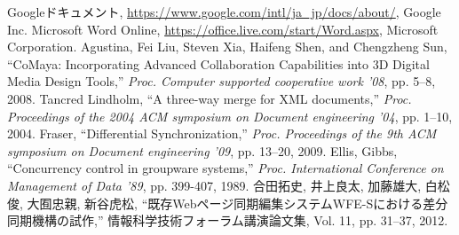 \renewcommand{\bibname}{参考文献}
\begin{thebibliography}{Longest9}

Googleドキュメント, \url{https://www.google.com/intl/ja_jp/docs/about/}, Google Inc.
Microsoft Word Online, \url{https://office.live.com/start/Word.aspx}, Microsoft Corporation.
Agustina, Fei Liu, Steven Xia, Haifeng Shen, and Chengzheng Sun, ``CoMaya: Incorporating Advanced Collaboration Capabilities into 3D Digital Media Design Tools,'' {\it Proc. Computer supported cooperative work '08}, pp. 5--8, 2008.
Tancred Lindholm, ``A three-way merge for XML documents,'' {\it Proc. Proceedings of the 2004 ACM symposium on Document engineering '04}, pp. 1--10, 2004.
Fraser,	``Differential Synchronization,''  {\it Proc. Proceedings of the 9th ACM symposium on Document engineering '09}, pp. 13--20, 2009.
Ellis, Gibbs, ``Concurrency control in groupware systems,'' {\it Proc. International Conference on Management of Data '89}, pp. 399-407, 1989.
合田拓史, 井上良太, 加藤雄大, 白松俊, 大囿忠親, 新谷虎松, ``既存Webページ同期編集システムWFE-Sにおける差分同期機構の試作,'' 情報科学技術フォーラム講演論文集, Vol. 11, pp. 31--37, 2012.

\end{thebibliography}
